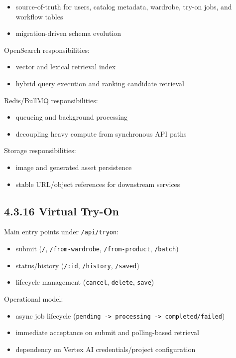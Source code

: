 \documentclass[12pt,a4paper]{report}
\begin{document}
\begin{itemize}
\item source-of-truth for users, catalog metadata, wardrobe, try-on jobs, and workflow tables
\item migration-driven schema evolution
\end{itemize}

OpenSearch responsibilities:

\begin{itemize}
\item vector and lexical retrieval index
\item hybrid query execution and ranking candidate retrieval
\end{itemize}

Redis/BullMQ responsibilities:

\begin{itemize}
\item queueing and background processing
\item decoupling heavy compute from synchronous API paths
\end{itemize}

Storage responsibilities:

\begin{itemize}
\item image and generated asset persistence
\item stable URL/object references for downstream services
\end{itemize}

\subsection{4.3.16 Virtual Try-On}
Main entry points under \texttt{/api/tryon}:

\begin{itemize}
\item submit (\texttt{/}, \texttt{/from-wardrobe}, \texttt{/from-product}, \texttt{/batch})
\item status/history (\texttt{/:id}, \texttt{/history}, \texttt{/saved})
\item lifecycle management (\texttt{cancel}, \texttt{delete}, \texttt{save})
\end{itemize}

Operational model:

\begin{itemize}
\item async job lifecycle (\texttt{pending -> processing -> completed/failed})
\item immediate acceptance on submit and polling-based retrieval
\item dependency on Vertex AI credentials/project configuration
\end{itemize}
\end{document}
